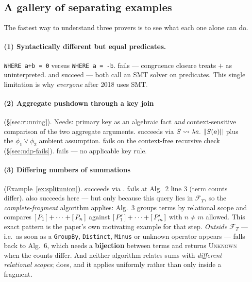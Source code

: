 \subsection{A gallery of separating examples}

The fastest way to understand three provers is to see what each one alone can do.

\paragraph{(1) Syntactically different but equal predicates.}
\lstinline|WHERE a+b = 0| versus \lstinline|WHERE a = -b|.
\udp{} \textcolor{cRed}{fails} --- congruence closure treats $+$ as uninterpreted.
\QED{} and \sqlsolver{} \textcolor{cGreen}{succeed} --- both call an SMT solver on
predicates. This single limitation is why \emph{everyone} after 2018 uses SMT.

\paragraph{(2) Aggregate pushdown through a key join} (\S\ref{sec:running}).
Needs: primary key as an algebraic fact \emph{and} context-sensitive comparison of the two
aggregate arguments. \QED{} \textcolor{cGreen}{succeeds} via
$S\rightsquigarrow\lambda a.\,\left\lVert S(a) \right\rVert$ plus the $\phi_1\vee\phi_2$ ambient assumption.
\udp{} \textcolor{cRed}{fails} on the context-free recursive check (\S\ref{sec:udp-fails}).
\spes{} \textcolor{cRed}{fails} --- no applicable key rule.

\paragraph{(3) Differing numbers of summations} (Example~\ref{ex:splitunion}).
\sqlsolver{} \textcolor{cGreen}{succeeds} via \liastar{}.
\udp{} \textcolor{cRed}{fails} at Alg.~2 line 3 (term counts differ).
\QED{} \textcolor{cGreen}{also succeeds} here --- but only because this query lies in
$\mathcal F_T$, so the \emph{complete-fragment} algorithm applies: Alg.~3 groups terms by
relational scope and compares $[\,P_1\,]+\cdots+[\,P_n\,]$ against
$[\,P'_1\,]+\cdots+[\,P'_m\,]$ with $n\neq m$ allowed. This exact pattern is the paper's own
motivating example for that step.
\emph{Outside} $\mathcal F_T$ --- i.e.\ as soon as a \texttt{GroupBy}, \texttt{Distinct},
\texttt{Minus} or unknown operator appears --- \QED{} falls back to Alg.~6, which needs a
\textbf{bijection} between terms and returns \textsc{Unknown} when the counts differ. And
neither \QED{} algorithm relates sums with \emph{different relational scopes}; \liastar{}
does, and it applies uniformly rather than only inside a fragment.

